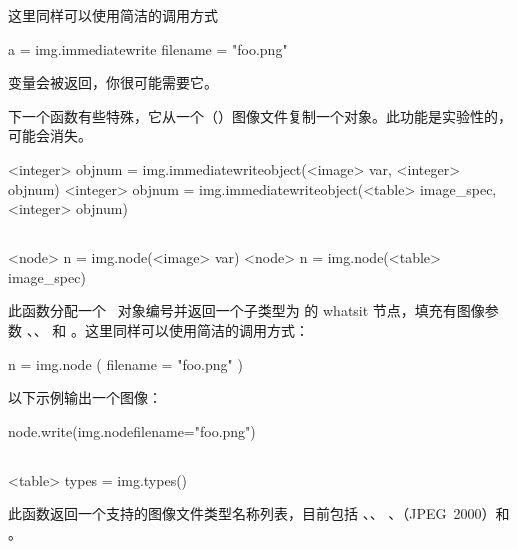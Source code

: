 这里同样可以使用简洁的调用方式

\begin{typing}
a = img.immediatewrite { filename = "foo.png" }
\end{typing}

 变量会被返回，你很可能需要它。

下一个函数有些特殊，它从一个（\PDF）图像文件复制一个对象。此功能是实验性的，
可能会消失。

\begin{typing}
<integer> objnum = img.immediatewriteobject(<image> var, <integer> objnum)
<integer> objnum = img.immediatewriteobject(<table> image_spec, <integer> objnum)
\end{typing}

\subsection{}


\begin{typing}
<node> n = img.node(<image> var)
<node> n = img.node(<table> image_spec)
\end{typing}

此函数分配一个 \PDF\ 对象编号并返回一个子类型为  的
whatsit 节点，填充有图像参数 、、 和
。这里同样可以使用简洁的调用方式：

\begin{typing}
n = img.node ({ filename = "foo.png" })
\end{typing}

以下示例输出一个图像：

\begin{typing}
node.write(img.node{filename="foo.png"})
\end{typing}

\subsection{}



\begin{typing}
<table> types = img.types()
\end{typing}

此函数返回一个支持的图像文件类型名称列表，目前包括 、、
、（JPEG~2000）和 。

